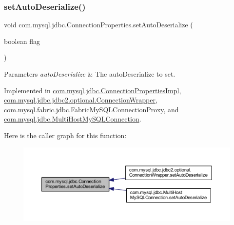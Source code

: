 \subsubsection{\texorpdfstring{set\+Auto\+Deserialize()}{setAutoDeserialize()}}
{\footnotesize\ttfamily void com.\+mysql.\+jdbc.\+Connection\+Properties.\+set\+Auto\+Deserialize (\begin{DoxyParamCaption}\item[{boolean}]{flag }\end{DoxyParamCaption})}


\begin{DoxyParams}{Parameters}
{\em auto\+Deserialize} & The auto\+Deserialize to set. \\
\hline
\end{DoxyParams}


Implemented in \mbox{\hyperlink{classcom_1_1mysql_1_1jdbc_1_1_connection_properties_impl_a819dd20bf495545134c0956fb56ac020}{com.\+mysql.\+jdbc.\+Connection\+Properties\+Impl}}, \mbox{\hyperlink{classcom_1_1mysql_1_1jdbc_1_1jdbc2_1_1optional_1_1_connection_wrapper_a4726b80bc80ed09e01a1e2be6e6fee84}{com.\+mysql.\+jdbc.\+jdbc2.\+optional.\+Connection\+Wrapper}}, \mbox{\hyperlink{classcom_1_1mysql_1_1fabric_1_1jdbc_1_1_fabric_my_s_q_l_connection_proxy_ad0d947dfa0d3f6eb80c1e0dcae6e2bd7}{com.\+mysql.\+fabric.\+jdbc.\+Fabric\+My\+S\+Q\+L\+Connection\+Proxy}}, and \mbox{\hyperlink{classcom_1_1mysql_1_1jdbc_1_1_multi_host_my_s_q_l_connection_a893d57a444b9a9bb7791efc34450b259}{com.\+mysql.\+jdbc.\+Multi\+Host\+My\+S\+Q\+L\+Connection}}.

Here is the caller graph for this function\+:\nopagebreak
\begin{figure}[H]
\begin{center}
\leavevmode
\includegraphics[width=350pt]{interfacecom_1_1mysql_1_1jdbc_1_1_connection_properties_ac22dc46adecba26efb43a6fdc239e292_icgraph}
\end{center}
\end{figure}
\mbox{\label{interfacecom_1_1mysql_1_1jdbc_1_1_connection_properties_aee554c71f65458593f28c1e7d79846d1}} 
